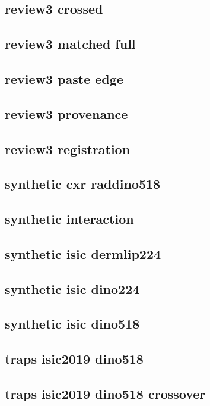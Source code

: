 \subsection*{review3 crossed}

\clearpage
\subsection*{review3 matched full}

\clearpage
\subsection*{review3 paste edge}

\clearpage
\subsection*{review3 provenance}

\clearpage
\subsection*{review3 registration}

\clearpage
\subsection*{synthetic cxr raddino518}

\clearpage
\subsection*{synthetic interaction}

\clearpage
\subsection*{synthetic isic dermlip224}

\clearpage
\subsection*{synthetic isic dino224}

\clearpage
\subsection*{synthetic isic dino518}

\clearpage
\subsection*{traps isic2019 dino518}

\clearpage
\subsection*{traps isic2019 dino518 crossover}

\clearpage